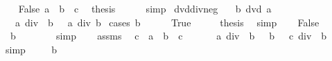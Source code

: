 \begin{isabellebody}
\ \ \isamarkupfalse%
\ False\ {\isacartoucheopen}a\ {\isacharequal}{\kern0pt}\ b\ {\isacharasterisk}{\kern0pt}\ c{\isacartoucheclose}\ \isamarkupfalse%
\ {\isacharquery}{\kern0pt}thesis\isanewline
\ \ \ \ \isamarkupfalse%
\ simp\isanewline
{}\isamarkupfalse%
%
\endisatagproof
{\isafoldproof}%
%
\isadelimproof
\isanewline
%
\endisadelimproof
\isanewline
{}\isamarkupfalse%
\ dvd{\isacharunderscore}{\kern0pt}div{\isacharunderscore}{\kern0pt}neg{\isacharcolon}{\kern0pt}\isanewline
\ \ \ {\isachardoublequoteopen}b\ dvd\ a{\isachardoublequoteclose}\isanewline
\ \ \ {\isachardoublequoteopen}a\ div\ {\isacharminus}{\kern0pt}\ b\ {\isacharequal}{\kern0pt}\ {\isacharminus}{\kern0pt}\ {\isacharparenleft}{\kern0pt}a\ div\ b{\isacharparenright}{\kern0pt}{\isachardoublequoteclose}\isanewline
%
\isadelimproof
%
\endisadelimproof
%
\isatagproof
{}\isamarkupfalse%
\ {\isacharparenleft}{\kern0pt}cases\ {\isachardoublequoteopen}b\ {\isacharequal}{\kern0pt}\ {}{\isachardoublequoteclose}{\isacharparenright}{\kern0pt}\isanewline
\ \ \isamarkupfalse%
\ True\isanewline
\ \ \isamarkupfalse%
\ \isamarkupfalse%
\ {\isacharquery}{\kern0pt}thesis\ \isamarkupfalse%
\ simp\isanewline
{}\isamarkupfalse%
\isanewline
\ \ \isamarkupfalse%
\ False\isanewline
\ \ \isamarkupfalse%
\ \isamarkupfalse%
\ {\isachardoublequoteopen}{\isacharminus}{\kern0pt}\ b\ {\isasymnoteq}\ {}{\isachardoublequoteclose}\isanewline
\ \ \ \ \isamarkupfalse%
\ simp\isanewline
\ \ \isamarkupfalse%
\ assms\ \isamarkupfalse%
\ c\ \ {\isachardoublequoteopen}a\ {\isacharequal}{\kern0pt}\ b\ {\isacharasterisk}{\kern0pt}\ c{\isachardoublequoteclose}\ \isacommand{{\isachardot}{\kern0pt}{\isachardot}{\kern0pt}}\isamarkupfalse%
\isanewline
\ \ \isamarkupfalse%
\ \isamarkupfalse%
\ {\isachardoublequoteopen}a\ div\ {\isacharminus}{\kern0pt}\ b\ {\isacharequal}{\kern0pt}\ {\isacharparenleft}{\kern0pt}{\isacharminus}{\kern0pt}\ b\ {\isacharasterisk}{\kern0pt}\ {\isacharminus}{\kern0pt}\ c{\isacharparenright}{\kern0pt}\ div\ {\isacharminus}{\kern0pt}\ b{\isachardoublequoteclose}\isanewline
\ \ \ \ \isamarkupfalse%
\ simp\isanewline
\ \ \isamarkupfalse%
\ {\isacartoucheopen}{\isacharminus}{\kern0pt}\ b\ {\isasymnoteq}\ {}{\isacartoucheclose}\ \isamarkupfalse%

\end{isabellebody}
